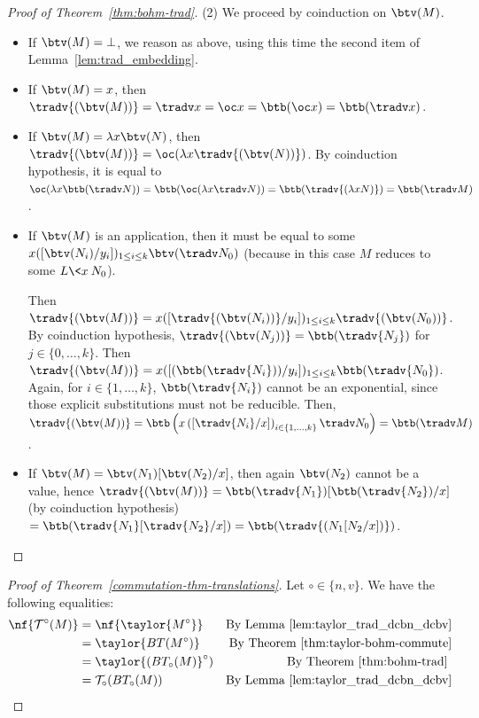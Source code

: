 \begin{proof}[Proof of Theorem~\ref{thm:bohm-trad}]
	(2) We proceed by coinduction on $\btv(M)$.
	\begin{itemize}
		\item If $\btv(M)=\bot$, we reason as above, using this time the
			second item of Lemma~\ref{lem:trad_embedding}.
		\item If $\btv(M)=x$, then $\tradv{(\btv(M))}=\tradv x=\oc
			x=\btb(\oc x)=\btb(\tradv x)$.
		\item If $\btv(M)=\lambda x\btv(N)$, then
			$\tradv{(\btv(M))}=\oc(\lambda x\tradv{(\btv(N))})$. By
			coinduction hypothesis, it is equal to $\oc(\lambda
			x\btb(\tradv N))=\btb(\oc(\lambda x\tradv
			N))=\btb(\tradv{(\lambda xN)})=\btb(\tradv M)$.
		\item If $\btv(M)$ is an application, then it must be equal to
			some $x([\btv(N_i)/y_i])_{1\leq i\leq k}\btv(\tradv N_0)$
			(because in this case $M$ reduces to some $L\<x\>N_0$).
			
			Then $\tradv{(\btv(M))}=
			x([\tradv{(\btv(N_i))}/y_i])_{1\leq i\leq k}\tradv{(\btv(N_0))}$.
			By coinduction hypothesis,
			$\tradv{(\btv(N_j))}=\btb(\tradv{N_j})$ for
			$j\in\{0,\dots ,k\}$. Then
			$\tradv{(\btv(M))}=
			x([(\btb(\tradv{N_i}))/y_i])_{1\leq i\leq
			k}\btb(\tradv{N_0})$. Again, for $i\in\{1,\dots ,k\}$,
			$\btb(\tradv{N_i})$ cannot be an exponential, since
			those explicit substitutions must not be reducible. Then,
			$\tradv{(\btv(M))}=\btb\left(x\left([\tradv{N_i}/x]\right)_{i\in\{1,\dots ,k\}}\tradv
			N_0\right)=\btb(\tradv M)$.
		\item If $\btv(M)=\btv(N_1)[\btv(N_2)/x]$, then again $\btv(N_2)$
			cannot be a value, hence
			$\tradv{(\btv(M))}=\btb(\tradv{N_1})[\btb(\tradv{N_2})/x]$
			(by coinduction hypothesis)
			$=\btb(\tradv{N_1}[\tradv{N_2}/x])=\btb(\tradv{(N_1[N_2/x])})$. \qedhere
	\end{itemize}
\end{proof}

\begin{proof}[Proof of Theorem~\ref{commutation-thm-translations}]
	Let $\circ\in\{n,v\}$. We have the following equalities:
	\begin{align*}
		\nf{\mathcal T^\circ (M)} &= \nf{\taylor{M^\circ}} &\text{By
		Lemma~\ref{lem:taylor_trad_dcbn_dcbv}} \\
		&= \taylor{BT(M^\circ)}   &\text{By
		Theorem~\ref{thm:taylor-bohm-commute}}  \\
		&= \taylor{(BT_\circ(M)}^\circ) &\text{By
		Theorem~\ref{thm:bohm-trad} } \\
		&=\mathcal T_\circ(BT_\circ(M)) &\text{By
		Lemma~\ref{lem:taylor_trad_dcbn_dcbv}}
	\end{align*}
\end{proof}



